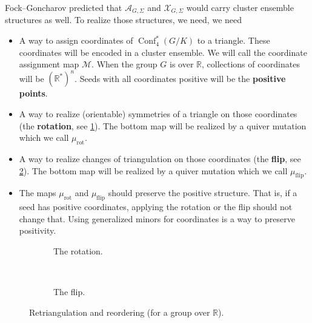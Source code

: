 \documentclass{amsart}
\theoremstyle{plain}
\theoremstyle{definition}
\theoremstyle{remark}
\newcommand{\conftoquiv}{\mathcal{M}}
\newcommand{\defined}[1]{\textbf{#1}}
\newcommand{\muflip}{{\mu_{\text{flip}}}}
\newcommand{\murot}{{\mu_{\text{rot}}}}
\DeclareMathOperator{\Conf}{Conf}
\begin{document}
  Fock--Goncharov predicted that $\mathcal{A}_{G,\Sigma}$ and
  $\mathcal{X}_{G,\Sigma}$ would carry cluster ensemble structures as
  well. To realize those structures, we need, we need
  \begin{itemize}
  \item
    A way to assign coordinates of $\Conf_4^{\ast}(G/K)$ to a triangle.
    These coordinates will be encoded in a cluster ensemble. We will
    call the coordinate assignment map $\conftoquiv$. When the group $G$
    is over $\mathbb{R}$, collections of coordinates will be
    $(\mathbb{R}^{\ast})^n$. Seeds with all coordinates positive will be
    the \defined{positive points}.
  \item
    A way to realize (orientable) symmetries of a triangle on those
    coordinates (the \defined{rotation}, see \cref{fig:short-rot}). The
    bottom map will be realized by a quiver mutation which we call
    $\murot$.
  \item
    A way to realize changes of triangulation on those coordinates (the
    \defined{flip}, see \cref{fig:short-flip}). The bottom map will be
    realized by a quiver mutation which we call $\muflip$.
  \item
    The maps $\murot$ and $\muflip$ should preserve the positive
    structure. That is, if a seed has positive coordinates, applying the
    rotation or the flip should not change that. Using generalized
    minors for coordinates is a way to preserve positivity.
  \end{itemize}

  \begin{figure}[h]
    \centering
    \begin{subfigure}[t]{0.30\textwidth}
      \centering 

      \caption{The rotation.
        \label{fig:short-rot}
      }
    \end{subfigure}
    ~ \hspace{0.05\textwidth} ~
    \begin{subfigure}[t]{0.50\textwidth}
      \centering 

      \caption{The flip.
        \label{fig:short-flip}
      }
    \end{subfigure}
    \caption{Retriangulation and reordering (for a group over
      $\mathbb{R}$).
      \label{fig:retriangulation-and-reordering}
    }
  \end{figure}
\end{document}
